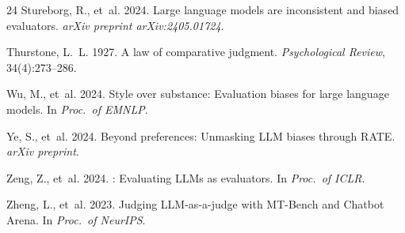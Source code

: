 \documentclass[11pt]{article}
\begin{document}
\begin{thebibliography}{24}
Stureborg, R., et~al. 2024.
\newblock Large language models are inconsistent and biased evaluators.
\newblock \emph{arXiv preprint arXiv:2405.01724}.

Thurstone, L.~L. 1927.
\newblock A law of comparative judgment.
\newblock \emph{Psychological Review}, 34(4):273--286.

Wu, M., et~al. 2024.
\newblock Style over substance: Evaluation biases for large language models.
\newblock In \emph{Proc.\ of EMNLP}.

Ye, S., et~al. 2024.
\newblock Beyond preferences: Unmasking {LLM} biases through {RATE}.
\newblock \emph{arXiv preprint}.

Zeng, Z., et~al. 2024.
: Evaluating {LLMs} as evaluators.
\newblock In \emph{Proc.\ of ICLR}.

Zheng, L., et~al. 2023.
\newblock Judging {LLM}-as-a-judge with {MT-Bench} and {Chatbot Arena}.
\newblock In \emph{Proc.\ of NeurIPS}.

\end{thebibliography}
\end{document}
